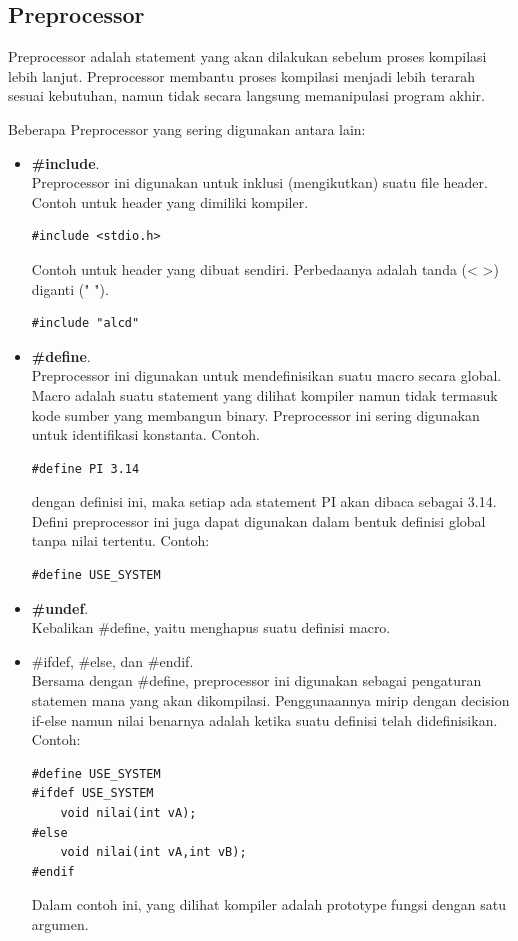 \documentclass[12pt,]{article}
\begin{document}
	\newpage
	\subsection{Preprocessor}
	
	Preprocessor adalah statement yang akan dilakukan sebelum proses kompilasi lebih lanjut.
	Preprocessor membantu proses kompilasi menjadi lebih terarah sesuai kebutuhan, namun tidak secara langsung memanipulasi program akhir.
	
	Beberapa Preprocessor yang sering digunakan antara lain:
	\begin{itemize}
		\item \textbf{\#include}. \\
		Preprocessor ini digunakan untuk inklusi (mengikutkan) suatu file header.
		Contoh untuk header yang dimiliki kompiler.
		\begin{verbatim}
#include <stdio.h>
		\end{verbatim}
		
		Contoh untuk header yang dibuat sendiri.
		Perbedaanya adalah tanda (< >) diganti (" ").
		\begin{verbatim}
#include "alcd"
		\end{verbatim}
		
		\item \textbf{\#define}. \\
		Preprocessor ini digunakan untuk mendefinisikan suatu macro secara global.
		Macro adalah suatu statement yang dilihat kompiler namun tidak termasuk kode sumber yang membangun binary.
		Preprocessor ini sering digunakan untuk identifikasi konstanta.
		Contoh.
		\begin{verbatim}
#define PI 3.14
		\end{verbatim}
		dengan definisi ini, maka setiap ada statement PI akan dibaca sebagai 3.14.
		Defini preprocessor ini juga dapat digunakan dalam bentuk definisi global tanpa nilai tertentu.
		Contoh:
		\begin{verbatim}
#define USE_SYSTEM
		\end{verbatim}
		
		\item \textbf{\#undef}. \\
		Kebalikan \#define, yaitu menghapus suatu definisi macro.
		
		\item \#ifdef, \#else, dan \#endif. \\
		Bersama dengan \#define, preprocessor ini digunakan sebagai pengaturan statemen mana yang akan dikompilasi.
		Penggunaannya mirip dengan decision if-else namun nilai benarnya adalah ketika suatu definisi telah didefinisikan.
		Contoh:
		\begin{verbatim}
#define USE_SYSTEM
#ifdef USE_SYSTEM
	void nilai(int vA);
#else
	void nilai(int vA,int vB);
#endif
		\end{verbatim}
		Dalam contoh ini, yang dilihat kompiler adalah prototype fungsi dengan satu argumen.
		

\end{itemize}
\end{document}
